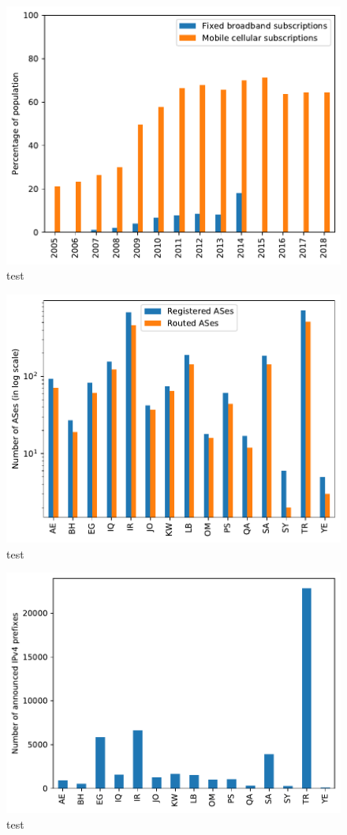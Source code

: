 \documentclass[a4paper,titlepage]{article}
\begin{document}
\begin{figure}
    \centering
    \includegraphics[width=0.8\linewidth]{../output/aggregate-lbs-users.pdf}
    \caption{test}
\end{figure}

\begin{figure}
    \centering
    \includegraphics[width=0.8\linewidth]{../output/as-stat.pdf}
    \caption{test}
\end{figure}

\begin{figure}
    \centering
    \includegraphics[width=0.8\linewidth]{../output/prefix-v4.pdf}
    \caption{test}
\end{figure}
\end{document}
